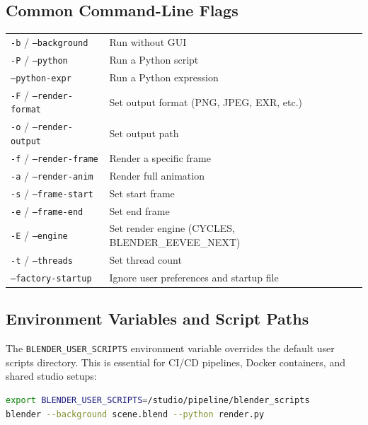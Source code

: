 \subsection{Common Command-Line Flags}

\begin{center}
\begin{tabularx}{\textwidth}{L{4cm}X}
\toprule
{}
 &  \\
\midrule
\texttt{-b} / \texttt{--background} & Run without GUI \\
\texttt{-P} / \texttt{--python} & Run a Python script \\
\texttt{--python-expr} & Run a Python expression \\
\texttt{-F} / \texttt{--render-format} & Set output format (PNG, JPEG, EXR, etc.) \\
\texttt{-o} / \texttt{--render-output} & Set output path \\
\texttt{-f} / \texttt{--render-frame} & Render a specific frame \\
\texttt{-a} / \texttt{--render-anim} & Render full animation \\
\texttt{-s} / \texttt{--frame-start} & Set start frame \\
\texttt{-e} / \texttt{--frame-end} & Set end frame \\
\texttt{-E} / \texttt{--engine} & Set render engine (CYCLES, BLENDER\_EEVEE\_NEXT) \\
\texttt{-t} / \texttt{--threads} & Set thread count \\
\texttt{--factory-startup} & Ignore user preferences and startup file \\
\bottomrule
\end{tabularx}
\end{center}

\subsection{Environment Variables and Script Paths}

The \texttt{BLENDER\_USER\_SCRIPTS} environment variable overrides the default user scripts directory. This is essential for CI/CD pipelines, Docker containers, and shared studio setups:

\begin{lstlisting}[language=bash]
export BLENDER_USER_SCRIPTS=/studio/pipeline/blender_scripts
blender --background scene.blend --python render.py
\end{lstlisting}

